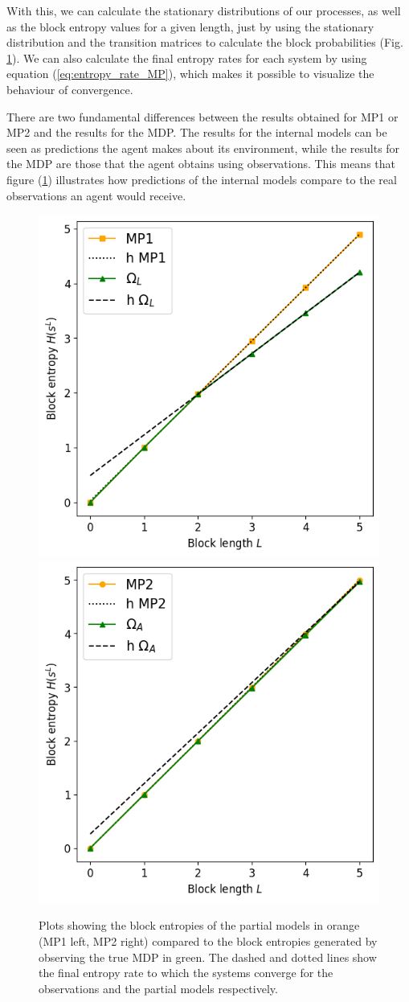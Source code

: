 \documentclass[12pt,a4paper]{article}
\begin{document}
With this, we can calculate the stationary distributions of our processes, as well as the block entropy values for a given length, just by using the stationary distribution and the transition matrices to calculate the block probabilities (Fig. \ref{fig:block_curves}).
We can also calculate the final entropy rates for each system by using equation (\ref{eq:entropy_rate_MP}), which makes it possible to visualize the behaviour of convergence.

There are two fundamental differences between the results obtained for MP1 or MP2 and the results for the MDP.
The results for the internal models can be seen as predictions the agent makes about its environment, while the results for the MDP are those that the agent obtains using observations.
This means that figure (\ref{fig:block_curves}) illustrates how predictions of the internal models compare to the real observations an agent would receive.

\begin{figure}[H]
    \centering
    \includegraphics[width=0.49\linewidth]{../figures/mp1_obs_L_thesis.png}
    \includegraphics[width=0.49\linewidth]{../figures/mp2_obs_A_thesis.png}
    \caption{\label{fig:block_curves}Plots showing the block entropies of the partial models in orange (MP1 left, MP2 right) compared to the block entropies generated by observing the true MDP in green. The dashed and dotted lines show the final entropy rate to which the systems converge for the observations and the partial models respectively.}
\end{figure}
\end{document}
